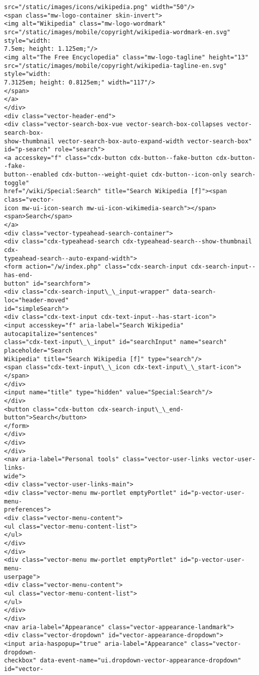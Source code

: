 \documentclass[11pt]{article}
\begin{document}
\begin{Verbatim}[commandchars=\\\{\}]
src="/static/images/icons/wikipedia.png" width="50"/>
<span class="mw-logo-container skin-invert">
<img alt="Wikipedia" class="mw-logo-wordmark"
src="/static/images/mobile/copyright/wikipedia-wordmark-en.svg" style="width:
7.5em; height: 1.125em;"/>
<img alt="The Free Encyclopedia" class="mw-logo-tagline" height="13"
src="/static/images/mobile/copyright/wikipedia-tagline-en.svg" style="width:
7.3125em; height: 0.8125em;" width="117"/>
</span>
</a>
</div>
<div class="vector-header-end">
<div class="vector-search-box-vue vector-search-box-collapses vector-search-box-
show-thumbnail vector-search-box-auto-expand-width vector-search-box"
id="p-search" role="search">
<a accesskey="f" class="cdx-button cdx-button--fake-button cdx-button--fake-
button--enabled cdx-button--weight-quiet cdx-button--icon-only search-toggle"
href="/wiki/Special:Search" title="Search Wikipedia [f]"><span class="vector-
icon mw-ui-icon-search mw-ui-icon-wikimedia-search"></span>
<span>Search</span>
</a>
<div class="vector-typeahead-search-container">
<div class="cdx-typeahead-search cdx-typeahead-search--show-thumbnail cdx-
typeahead-search--auto-expand-width">
<form action="/w/index.php" class="cdx-search-input cdx-search-input--has-end-
button" id="searchform">
<div class="cdx-search-input\_\_input-wrapper" data-search-loc="header-moved"
id="simpleSearch">
<div class="cdx-text-input cdx-text-input--has-start-icon">
<input accesskey="f" aria-label="Search Wikipedia" autocapitalize="sentences"
class="cdx-text-input\_\_input" id="searchInput" name="search" placeholder="Search
Wikipedia" title="Search Wikipedia [f]" type="search"/>
<span class="cdx-text-input\_\_icon cdx-text-input\_\_start-icon"></span>
</div>
<input name="title" type="hidden" value="Special:Search"/>
</div>
<button class="cdx-button cdx-search-input\_\_end-button">Search</button>
</form>
</div>
</div>
</div>
<nav aria-label="Personal tools" class="vector-user-links vector-user-links-
wide">
<div class="vector-user-links-main">
<div class="vector-menu mw-portlet emptyPortlet" id="p-vector-user-menu-
preferences">
<div class="vector-menu-content">
<ul class="vector-menu-content-list">
</ul>
</div>
</div>
<div class="vector-menu mw-portlet emptyPortlet" id="p-vector-user-menu-
userpage">
<div class="vector-menu-content">
<ul class="vector-menu-content-list">
</ul>
</div>
</div>
<nav aria-label="Appearance" class="vector-appearance-landmark">
<div class="vector-dropdown" id="vector-appearance-dropdown">
<input aria-haspopup="true" aria-label="Appearance" class="vector-dropdown-
checkbox" data-event-name="ui.dropdown-vector-appearance-dropdown" id="vector-

\end{Verbatim}
\end{document}
